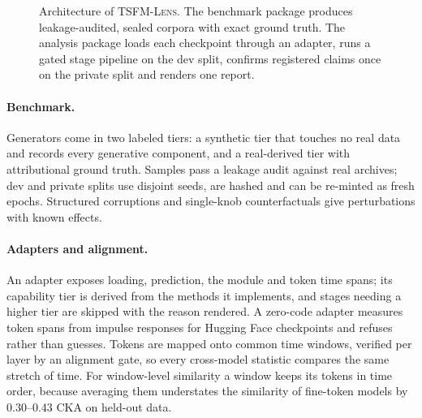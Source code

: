 \documentclass[twoside,11pt]{article}
\newcommand{\tool}{\textsc{TSFM-Lens}}
\begin{document}
\begin{figure}[t]
\caption{Architecture of \tool{}. The benchmark package produces leakage-audited, sealed corpora with exact
ground truth. The analysis package loads each checkpoint through an adapter, runs a gated stage pipeline on
the dev split, confirms registered claims once on the private split and renders one report.}
\label{fig:arch}
\end{figure}

\paragraph{Benchmark.} Generators come in two labeled tiers: a synthetic tier that touches no real data and records
every generative component, and a real-derived tier with attributional ground truth. Samples pass a leakage audit
against real archives; dev and private splits use disjoint seeds, are hashed and can be re-minted as fresh epochs.
Structured corruptions and single-knob counterfactuals give perturbations with known effects.

\paragraph{Adapters and alignment.} An adapter exposes loading, prediction, the module and token time spans; its
capability tier is derived from the methods it implements, and stages needing a higher tier are skipped with the
reason rendered. A zero-code adapter measures token spans from impulse responses for Hugging Face checkpoints and
refuses rather than guesses. Tokens are mapped onto common time windows, verified per layer by an alignment gate, so every
cross-model statistic compares the same stretch of time. For window-level similarity a window keeps its tokens in
time order, because averaging them understates the similarity of fine-token models by 0.30--0.43 CKA on held-out data.
\end{document}
